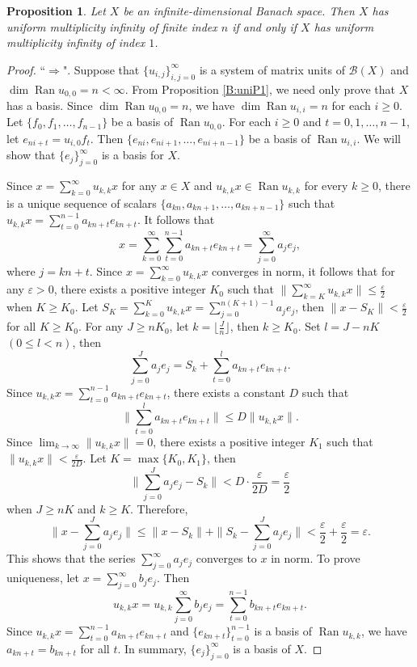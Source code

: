 \documentclass[12pt]{amsart}
\numberwithin{equation}{section}
\theoremstyle{plain}
\newtheorem{prop}[thm]{Proposition}
\theoremstyle{definition}
\newcommand{\B}{{\mathcal{B}}}
\newcommand{\ran}{\operatorname{Ran}}
\begin{document}
\begin{prop}\label{S:equi}
Let $X$ be an infinite-dimensional Banach space. Then
$X$ has uniform multiplicity infinity of finite index $n$ if and only if
$X$ has uniform multiplicity infinity of index $1$.
\end{prop}
\begin{proof}
``$\Rightarrow$".
Suppose that $\{u_{i,j}\}_{i,j=0}^{\infty}$ is a system of matrix units of $\B(X)$ and $\dim\ran u_{0,0}=n<\infty$.
From Proposition \ref{B:uniP1}, we need only prove that $X$ has a basis.
Since $\dim\ran u_{0,0}=n$,
we have $\dim\ran u_{i,i}=n$ for each $i\geq 0$.
Let $\{f_0,f_1,\ldots,f_{n-1}\}$ be a basis of $\ran u_{0,0}$.
For each $i\geq 0$ and $t=0,1,\ldots,n-1$, let
$e_{ni+t}=u_{i,0}f_t$.
Then
$\{e_{ni},e_{ni+1},\ldots,e_{ni+n-1}\}$
be a basis of $\ran u_{i,i}$.
We will show that $\{e_{j}\}_{j=0}^{\infty}$ is a basis for $X$.

Since $x=\sum_{k=0}^{\infty}u_{k,k}x$ for any $x\in X$ and $u_{k,k}x\in
\ran u_{k,k}$ for every $k\geq 0$, there is a unique
sequence of scalars $\{a_{kn},a_{kn+1},\ldots,a_{kn+n-1}\}$
such that $u_{k,k}x=\sum_{t=0}^{n-1}a_{kn+t}e_{kn+t}$.
It follows that
$$x=\sum_{k=0}^{\infty}\sum_{t=0}^{n-1}a_{kn+t}e_{kn+t}=\sum_{j=0}^{\infty}a_je_j,$$
where $j=kn+t$.
Since
$x=\sum_{k=0}^{\infty} u_{k,k} x$ converges in norm, it follows that
for any
$\varepsilon>0$, there exists a positive integer $K_0$ such that
$\|\sum_{k=K}^{\infty}u_{k,k}x\| \leq \frac{\varepsilon}{2}$ when $K\geq K_0$.
Let $S_K=\sum_{k=0}^{K}u_{k,k}x=\sum_{j=0}^{n(K+1)-1}a_je_j$,
then $\|x-S_{K}\|<\frac{\varepsilon}{2}$ for all $K\geq K_0$.
For any $J\geq nK_0$, let $k=\lfloor \frac{J}{n} \rfloor$, then $k\geq K_0$.
Set $l=J-nK$ $(0\leq l<n)$, then
$$\sum_{j=0}^{J}a_je_j=S_k+\sum_{t=0}^{l}a_{kn+t}e_{kn+t}.$$
Since $u_{k,k}x=\sum_{t=0}^{n-1}a_{kn+t}e_{kn+t}$, there exists a constant $D$ such that
$$\|\sum_{t=0}^{l}a_{kn+t}e_{kn+t}\|\leq D\|u_{k,k} x\|.$$
Since $\lim_{k\to\infty}\|u_{k,k}x\|=0$, there exists a positive integer $K_1$ such that
$\|u_{k,k} x\|<\frac{\varepsilon}{2D}$.
Let $K=\max\{K_0,K_1\}$, then
$$\|\sum_{j=0}^{J}a_j e_j-S_k\|<D\cdot \frac{\varepsilon}{2D}=\frac{\varepsilon}{2}$$
when $J\geq nK$ and $k\geq K$.
Therefore,
$$\|x-\sum_{j=0}^{J}a_je_j\|\leq \|x-S_k\|+\|S_k-\sum_{j=0}^{J}a_je_j\|<\frac{\varepsilon}{2}+\frac{\varepsilon}{2}=\varepsilon.$$
This shows that
the series
$\sum_{j=0}^{\infty} a_j e_j$ converges to $x$ in norm.
To prove uniqueness,
let $x=\sum_{j=0}^{\infty}b_je_j$.
Then
$$u_{k,k} x=u_{k,k}\sum_{j=0}^{\infty}b_j e_j=\sum_{t=0}^{n-1}b_{kn+t}e_{kn+t}.$$
Since $u_{k,k}x=\sum_{t=0}^{n-1}a_{kn+t}e_{kn+t}$ and $\{e_{kn+t}\}_{t=0}^{n-1}$ is a basis of $\ran u_{k,k}$,
we have $a_{kn+t}=b_{kn+t}$ for all $t$.
In summary, $\{e_j\}_{j=0}^{\infty}$ is a basis of $X$.


\end{proof}
\end{document}
